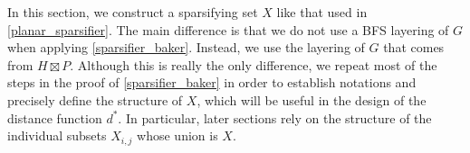 \documentclass{patmorin}
\renewcommand{\le}{\leqslant}
\DeclareMathOperator{\tw}{tw}
\begin{document}

In this section, we construct a sparsifying set $X$ like that used in \cref{planar_sparsifier}.  The main difference is that we do not use a BFS layering of $G$ when applying \cref{sparsifier_baker}. Instead, we use the layering of $G$ that comes from $H\boxtimes P$.  Although this is really the only difference, we repeat most of the steps in the proof of \cref{sparsifier_baker} in order to establish notations and precisely define the structure of $X$, which will be useful in the design of the distance function $d^*$.  In particular, later sections rely on the structure of the individual subsets $X_{i,j}$ whose union is $X$.

%
%
\end{document}
